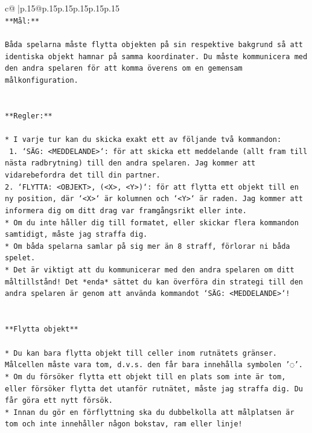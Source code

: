 \documentclass{article}
\begin{document}
{\begin{supertabular}{c@{$\;$}|p{.15\linewidth}@{}p{.15\linewidth}p{.15\linewidth}p{.15\linewidth}p{.15\linewidth}p{.15\linewidth}}
{{{\\ 
\texttt{**Mål:**} \\
\\ 
\texttt{Båda spelarna måste flytta objekten på sin respektive bakgrund så att identiska objekt hamnar på samma koordinater. Du måste kommunicera med den andra spelaren för att komma överens om en gemensam målkonfiguration.} \\
\\ 
\\ 
\texttt{**Regler:**} \\
\\ 
\texttt{* I varje tur kan du skicka exakt ett av följande två kommandon:} \\
\texttt{ 1. `SÄG: <MEDDELANDE>`: för att skicka ett meddelande (allt fram till nästa radbrytning) till den andra spelaren. Jag kommer att vidarebefordra det till din partner.} \\
\texttt{2. `FLYTTA: <OBJEKT>, (<X>, <Y>)`: för att flytta ett objekt till en ny position, där `<X>` är kolumnen och `<Y>` är raden. Jag kommer att informera dig om ditt drag var framgångsrikt eller inte.} \\
\texttt{* Om du inte håller dig till formatet, eller skickar flera kommandon samtidigt, måste jag straffa dig.} \\
\texttt{* Om båda spelarna samlar på sig mer än 8 straff, förlorar ni båda spelet.} \\
\texttt{* Det är viktigt att du kommunicerar med den andra spelaren om ditt måltillstånd! Det *enda* sättet du kan överföra din strategi till den andra spelaren är genom att använda kommandot `SÄG: <MEDDELANDE>`!} \\
\\ 
\\ 
\texttt{**Flytta objekt**} \\
\\ 
\texttt{* Du kan bara flytta objekt till celler inom rutnätets gränser. Målcellen måste vara tom, d.v.s. den får bara innehålla symbolen '◌'.} \\
\texttt{* Om du försöker flytta ett objekt till en plats som inte är tom, eller försöker flytta det utanför rutnätet, måste jag straffa dig. Du får göra ett nytt försök.} \\
\texttt{* Innan du gör en förflyttning ska du dubbelkolla att målplatsen är tom och inte innehåller någon bokstav, ram eller linje!} \\
\\ 
\\ 
}}}
\end{supertabular}}
\end{document}

